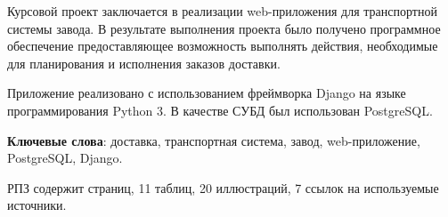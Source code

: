 Курсовой проект заключается в реализации web-приложения для транспортной системы завода. В результате выполнения проекта было получено программное обеспечение предоставляющее возможность выполнять действия, необходимые для планирования и исполнения заказов доставки.

Приложение реализовано с использованием фреймворка Django на языке программирования Python 3. В качестве СУБД был использован PostgreSQL.

\textbf{Ключевые слова}: доставка, транспортная система, завод, web-приложение, PostgreSQL, Django.

РПЗ содержит \pageref{lastpage} страниц, 
11 таблиц,
20 иллюстраций,
7 ссылок на используемые источники.
